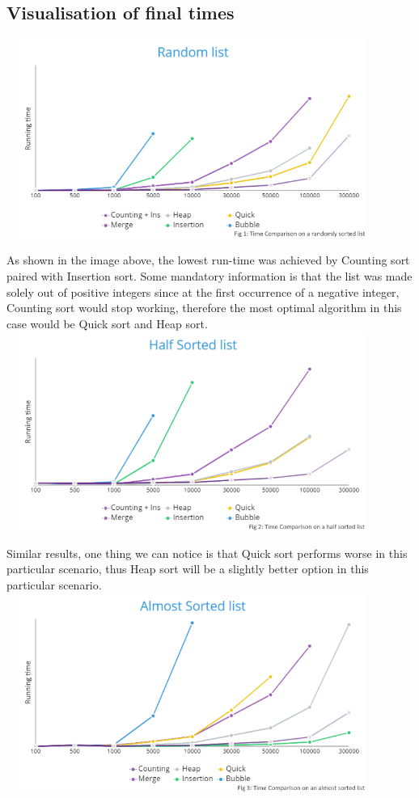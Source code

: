 \documentclass{article}
\begin{document}
\begin{center}
\section{Visualisation of final times}  

\includegraphics[width=12.2cm, height=6.5cm]{Pics/Random list.png}

 As shown in the image above, the lowest run-time was achieved by Counting sort paired with Insertion sort. Some mandatory information is that the list was made solely out of positive integers since at the first occurrence of a negative integer, Counting sort would stop working, therefore the most optimal algorithm in this case would be Quick sort and Heap sort.
\smallbreak
\includegraphics[width=12.2cm, height=6.5cm]{Pics/Half Sorted list.png}

Similar results, one thing we can notice is that Quick sort performs worse in this particular scenario, thus Heap sort will be a slightly better option in this particular scenario.
\includegraphics[width=12.2cm, height=6.5cm]{Pics/Almost Sorted list.png}


\end{center}
\end{document}
